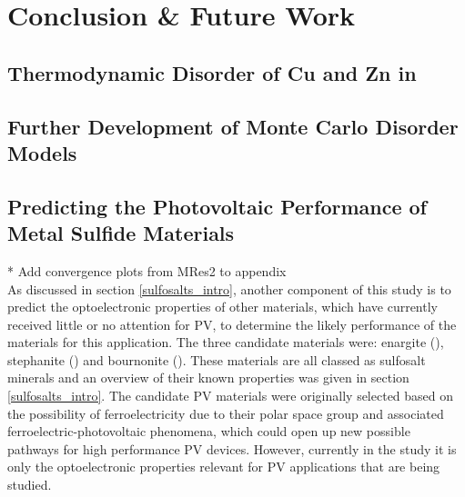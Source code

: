 
\chapter{Conclusion \& Future Work}
\label{ch:conclusions}

\section{Thermodynamic Disorder of Cu and Zn in {\CZTS}}



\section{Further Development of Monte Carlo Disorder Models}



\section{Predicting the Photovoltaic Performance of Metal Sulfide Materials}\label{sulfosalts_proj}
* Add convergence plots from MRes2 to appendix\\

As discussed in section \ref{sulfosalts_intro}, another component of this study is to predict the optoelectronic properties of other materials, which have currently received little or no attention for PV, to determine the likely performance of the materials for this application. The three candidate materials were: enargite ({\enargite}), stephanite ({\stephanite}) and bournonite ({\bournonite}). These materials are all classed as sulfosalt minerals and an overview of their known properties was given in section \ref{sulfosalts_intro}. The candidate PV materials were originally selected based on the possibility of ferroelectricity due to their polar space group and associated ferroelectric-photovoltaic phenomena, which could open up new possible pathways for high performance PV devices. However, currently in the study it is only the optoelectronic properties relevant for PV applications that are being studied.\\

